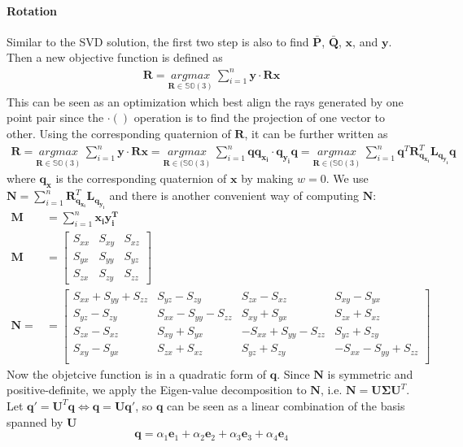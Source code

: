 \documentclass[a4paper]{report}
\begin{document}
\paragraph{Rotation}
Similar to the SVD solution, the first two step is also to find $\bar{\mathbf{P}}$, $\bar{\mathbf{Q}}$, $\mathbf{x}$, and $\mathbf{y}$. Then a new objective function is defined as
\begin{align*}
\mathbf{R}=\underset{\mathbf{R}\in \mathbb{SO}(3)}{argmax}\ \sum_{i=1}^{n} \mathbf{y} \cdot \mathbf{Rx}
\end{align*}
This can be seen as an optimization which best align the rays generated by one point pair since the $\cdot()$ operation is to find the projection of one vector to other. Using the corresponding quaternion of $\mathbf{R}$, it can be further written as
\begin{align*}
\mathbf{R}=\underset{\mathbf{R}\in \mathbb{SO}(3)}{argmax}\ \sum_{i=1}^{n} \mathbf{y} \cdot \mathbf{Rx}=\underset{\mathbf{R}\in (\mathbb{SO}(3)}{argmax}\ \sum_{i=1}^{n} \mathbf{qq_{x_i}} \cdot \mathbf{q_{y_i}q} = \underset{\mathbf{R}\in (\mathbb{SO}(3)}{argmax}\  \sum_{i=1}^{n} \mathbf{q}^T\mathbf{R}_{\mathbf{q_{x_i}}}^T\mathbf{L}_{\mathbf{q_{y_i}}}\mathbf{q}
\end{align*}
where $\mathbf{q_x}$ is the corresponding quaternion of $\mathbf{x}$ by making $w=0$. 
We use $\mathbf{N}=\sum_{i=1}^{n}\mathbf{R}_{\mathbf{q_{x_i}}}^T\mathbf{L}_{\mathbf{q_{y_i}}}$ and there is another convenient way of computing $\mathbf{N}$:
\begin{align*}
	\mathbf{M}&=\sum_{i=1}^{n} \mathbf{x_iy_i^T} \\
	\mathbf{M}&=\left[
	\begin{matrix}
	S_{xx} & S_{xy} & S_{xz} \\
	S_{yx} & S_{yy} & S_{yz} \\
	S_{zx} & S_{zy} & S_{zz} 
	\end{matrix}
	\right] \\
	\mathbf{N}=&=\left[
	\begin{matrix}
	S_{xx}+S_{yy}+S_{zz} & S_{yz}-S_{zy} & S_{zx}-S_{xz} & S_{xy}-S_{yx} \\
	S_{yz}-S_{zy} & S_{xx}-S_{yy}-S_{zz} & S_{xy}+S_{yx} & S_{zx}+S_{xz} \\
	S_{zx}-S_{xz} &  S_{xy}+S_{yx} & -S_{xx}+S_{yy}-S_{zz}& S_{yz}+S_{zy} \\
	S_{xy}-S_{yx} & S_{zx}+S_{xz} & S_{yz}+S_{zy} & -S_{xx}-S_{yy}+S_{zz} \\
	\end{matrix}
	\right] 
\end{align*}
Now the objetcive function is in a quadratic form of $\mathbf{q}$. Since $\mathbf{N}$ is symmetric and positive-definite, we apply the Eigen-value decomposition to $\mathbf{N}$, i.e. $\mathbf{N}=\mathbf{U}\mathbf{\Sigma}\mathbf{U}^T$. Let $\mathbf{q}'=\mathbf{U}^T\mathbf{q} \Leftrightarrow \mathbf{q}=\mathbf{U}\mathbf{q}'$, so $\mathbf{q}$ can be seen as a linear combination of the basis spanned by $\mathbf{U}$
$$
\mathbf{q}=\alpha_1 \mathbf{e}_1 + \alpha_2 \mathbf{e}_2+\alpha_3 \mathbf{e}_3+\alpha_4 \mathbf{e}_4
$$ 
\end{document}
